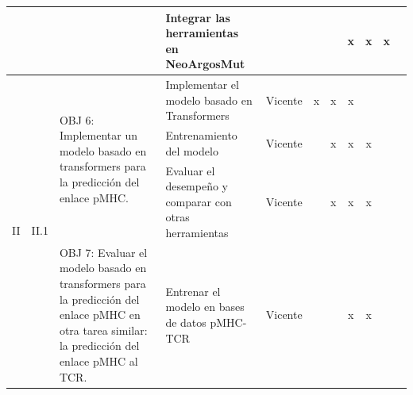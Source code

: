 \documentclass[a4paper,11pt]{article}
\begin{document}
\begin{table}[H]
\begin{tabular}{p{0.6cm}p{0.6cm}p{6cm}p{4cm}p{1cm}cccccc}
		&                       &                                                                                                                                                                                                                                                                                            & Integrar las herramientas en NeoArgosMut                                                             &                    &                       &                        & x                    & x                    & \multicolumn{1}{c}{x} &                        \\ \hline \hline
		\multirow{12}{*}{II} & \multirow{5}{*}{II.1} & \multirow{3}{6cm}{OBJ 6: Implementar un modelo basado en transformers para la predicción del enlace pMHC.} & Implementar el modelo basado en Transformers                                                         & Vicente            & \multicolumn{1}{c}{x} & \multicolumn{1}{c}{x}  & x                    & \multicolumn{1}{l}{} &                       &                        \\
		&                       &                                                                                                                                                                                                                                                                                            & Entrenamiento del modelo                                                                             & Vicente            &                       & \multicolumn{1}{c}{x}  & x                    & x                    &                       &                        \\
		&                       &                                                                                                                                                                                                                                                                                            & Evaluar el desempeño y comparar con otras herramientas                                               & Vicente            &                       & \multicolumn{1}{c}{x}  & x                    & x                    &                       &                        \\
		&                       & \multirow{2}{6cm}{OBJ 7: Evaluar el modelo basado en transformers para la predicción del enlace pMHC en otra tarea similar: la predicción del enlace pMHC al TCR.}                                                                                                             & Entrenar el modelo en bases de datos pMHC-TCR                                                        & Vicente            &                       &                        & x                    & x                    &                       &                        \\

\end{tabular}
\end{table}
\end{document}
